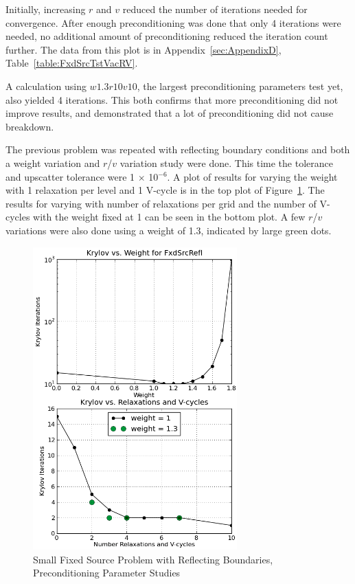 Initially, increasing $r$ and $v$ reduced the number of iterations needed for convergence. After enough preconditioning was done that only 4 iterations were needed, no additional amount of preconditioning reduced the iteration count further. The data from this plot is in Appendix~\ref{sec:AppendixD}, Table~\ref{table:FxdSrcTstVacRV}. 

A calculation using $w1.3r10v10$, the largest preconditioning parameters test yet, also yielded 4 iterations. This both confirms that more preconditioning did not improve results, and demonstrated that a lot of preconditioning did not cause breakdown. 

The previous problem was repeated with reflecting boundary conditions and both a weight variation and $r$/$v$  variation study were done. This time the tolerance and upscatter tolerance were 1 $\times$ 10$^{-6}$. A plot of results for varying the weight with 1 relaxation per level and 1 V-cycle is in the top plot of Figure~\ref{fig:FxdSrcRefl}. The results for varying with number of relaxations per grid and the number of V-cycles with the weight fixed at 1 can be seen in the bottom plot. A few $r$/$v$ variations were also done using a weight of 1.3, indicated by large green dots.
%
\begin{figure}[!ht]
    \begin{center}
      \includegraphics [width=0.7\textwidth, height=0.8\textheight] {FxdSrcRefl}
   \end{center}
   \caption{Small Fixed Source Problem with Reflecting Boundaries, Preconditioning Parameter Studies}
   \label{fig:FxdSrcRefl}
\end{figure}

